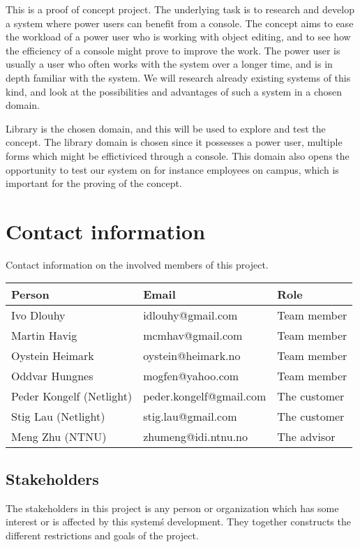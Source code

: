 This is a proof of concept project. The underlying task is to research and develop a system where power users can benefit from a console.  The concept aims to ease the workload of a power user who is working with object editing, and to see how the efficiency of a console might prove to improve the work. The power user is usually a user who often works with the system over a longer time, and is in depth familiar with the system. We will research already existing systems of this kind, and look at the possibilities and advantages of such a system in a chosen domain.

Library is the chosen domain, and this will be used to explore and test the concept. The library domain is chosen since it possesses a power user, multiple forms which might be effictiviced through a console. This domain also opens the opportunity to test our system on for instance employees on campus, which is important for the proving of the concept.


\section{Contact information}
Contact information on the involved members of this project.
\begin{table}
    \begin{tabular}{ | l | l | l | }
      \hline
      \textbf{Person} & \textbf{Email} & \textbf{Role} \\ \hline
      Ivo Dlouhy & idlouhy@gmail.com & Team member \\ \hline
      Martin Havig & mcmhav@gmail.com & Team member \\ \hline
      Oystein Heimark & oystein@heimark.no & Team member \\ \hline
      Oddvar Hungnes & mogfen@yahoo.com & Team member \\ \hline \hline
      Peder Kongelf (Netlight) & peder.kongelf@gmail.com & The customer \\ \hline
      Stig Lau (Netlight) & stig.lau@gmail.com & The customer \\ \hline \hline
      Meng Zhu (NTNU) & zhumeng@idi.ntnu.no & The advisor \\ \hline
    \end{tabular}
\end{table}

\subsection{Stakeholders}
The stakeholders in this project is any person or organization which has some interest or is affected by this system\'s development. They together constructs the different restrictions and goals of the project.


